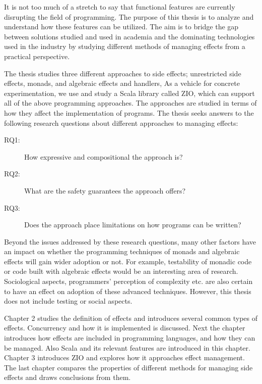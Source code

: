 It is not too much of a stretch to say that functional features are currently disrupting the field of programming. The purpose of this thesis is to analyze and understand how these features can be utilized. The aim is to bridge the gap between solutions studied and used in academia and the dominating technologies used in the industry by studying different methods of managing effects from a practical perspective.

The thesis studies three different approaches to side effects; unrestricted side effects, monads, and algebraic effects and handlers,  As a vehicle for concrete experimentation, we use and study a Scala library called ZIO, which can support all of the above programming approaches. The approaches are studied in terms of how they affect the implementation of programs. The thesis seeks answers to the following research questions about different approaches to managing effects:
\begin{description}
    \item[RQ1:] How expressive and compositional the approach is?
    \item[RQ2:] What are the safety guarantees the approach offers?
    \item[RQ3:] Does the approach place limitations on how programs can be written?
\end{description}


Beyond the issues addressed by these research questions, many other factors have an impact on whether the programming techniques of monads and algebraic effects will gain wider adoption or not. For example, testability of monadic code or code built with algebraic effects would be an interesting area of research. 
Sociological aspects, programmers' perception of complexity etc. are also certain to have an effect on adoption of these advanced techniques. However, this thesis does not include testing or social aspects.

Chapter 2 studies the definition of effects and introduces several common types of effects. Concurrency and how it is implemented is discussed. Next the chapter introduces how effects are included in programming languages, and how they can be managed. Also Scala and its relevant features are introduced in this chapter. Chapter 3 introduces ZIO and explores how it approaches effect management.  The last chapter compares the properties of different methods for managing side effects and draws conclusions from them.


